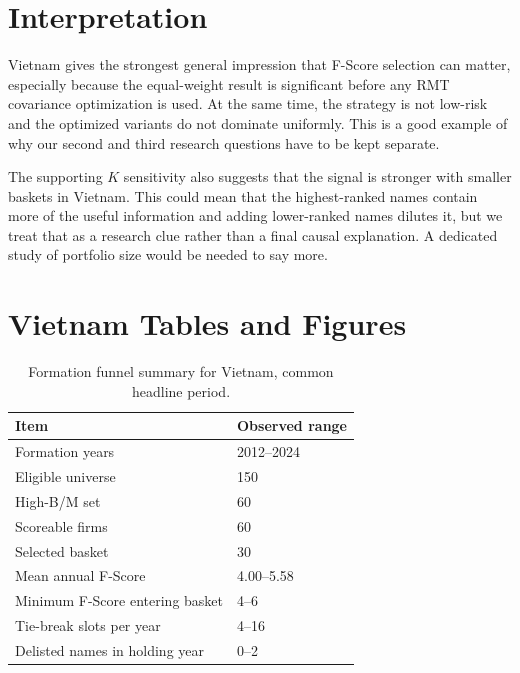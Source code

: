 \documentclass[11pt,a4paper]{report}
\numberwithin{figure}{chapter}
\numberwithin{table}{chapter}
\numberwithin{equation}{chapter}
\begin{document}
\section{Interpretation}

Vietnam gives the strongest general impression that F-Score selection can matter, especially because the equal-weight result is significant before any RMT covariance optimization is used. At the same time, the strategy is not low-risk and the optimized variants do not dominate uniformly. This is a good example of why our second and third research questions have to be kept separate.

The supporting $K$ sensitivity also suggests that the signal is stronger with smaller baskets in Vietnam. This could mean that the highest-ranked names contain more of the useful information and adding lower-ranked names dilutes it, but we treat that as a research clue rather than a final causal explanation. A dedicated study of portfolio size would be needed to say more.

\section{Vietnam Tables and Figures}
\label{sec:vietnam_exhibits}

\begin{table}[H]
\centering
\scriptsize
\caption{Formation funnel summary for Vietnam, common headline period.}
\label{tab:vietnam_funnel}
\begin{tabularx}{0.72\textwidth}{p{} X}
\hline
\textbf{Item} & \textbf{Observed range} \\
\hline
Formation years & 2012--2024 \\
Eligible universe & 150 \\
High-B/M set & 60 \\
Scoreable firms & 60 \\
Selected basket & 30 \\
Mean annual F-Score & 4.00--5.58 \\
Minimum F-Score entering basket & 4--6 \\
Tie-break slots per year & 4--16 \\
Delisted names in holding year & 0--2 \\
\hline
\end{tabularx}
\end{table}

\newpage

\vspace*{\fill}
\end{document}
